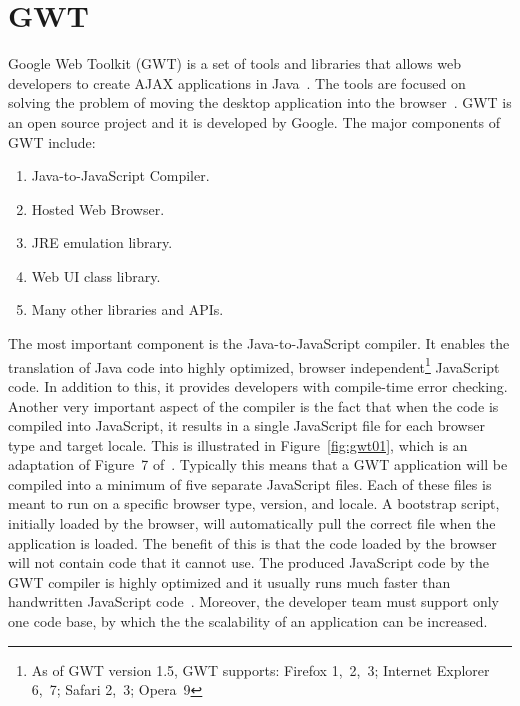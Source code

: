 \section{GWT} 
\label{sec:gwt}
Google Web Toolkit (GWT) is a set of tools and libraries that allows
web developers to create AJAX applications in Java~\cite{wgwt}. 
The tools are focused on solving the problem of moving the desktop application into the
browser~\cite{bgwt2}. GWT is an open source project and it is developed 
by Google. The major components of GWT include: 

\begin{enumerate}
	\item Java-to-JavaScript Compiler.
	\item Hosted Web Browser.
	\item JRE emulation library.
	\item Web UI class library.
	\item Many other libraries and APIs.
\end{enumerate}

The most important component is the Java-to-JavaScript compiler. It enables the 
translation of Java code into highly optimized, browser 
independent\footnote{As of GWT version 1.5, GWT supports: 
Firefox 1,~2,~3; Internet Explorer 6,~7; Safari 2,~3; Opera~9}
JavaScript code. 
In addition to this, it provides developers with compile-time error checking. 
Another very important
aspect of the compiler is the fact that when the code is compiled into JavaScript,
it results in 
a single JavaScript file for each browser type and target locale. This is illustrated 
in Figure~\ref{fig:gwt01}, which is an adaptation of Figure~7 of~\cite{wgio2}. 
Typically this means that a GWT application will be compiled into 
a minimum of five separate JavaScript files. Each of these files is meant to run 
on a specific browser type, version, and locale. A bootstrap script, initially 
loaded by the browser, will 
automatically pull the correct file when the
application is loaded. The benefit of this is that the code loaded by the browser 
will not contain code that it cannot use. The produced JavaScript code by the GWT 
compiler is highly optimized and it usually runs much faster than handwritten 
JavaScript code~\cite{wgio1}. Moreover, the developer team must support only
one code base, by which the the scalability of an application can be increased.  

